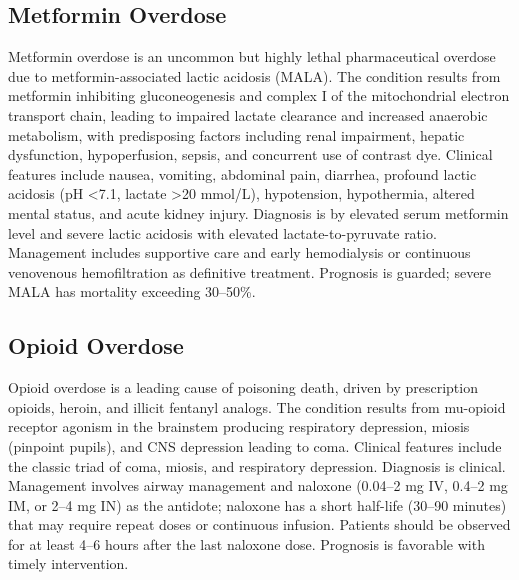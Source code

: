 \subsection{Metformin Overdose}
\label{sec:Metformin Overdose}
Metformin overdose is an uncommon but highly lethal pharmaceutical overdose due to metformin-associated lactic acidosis (MALA). The condition results from metformin inhibiting gluconeogenesis and complex I of the mitochondrial electron transport chain, leading to impaired lactate clearance and increased anaerobic metabolism, with predisposing factors including renal impairment, hepatic dysfunction, hypoperfusion, sepsis, and concurrent use of contrast dye. Clinical features include nausea, vomiting, abdominal pain, diarrhea, profound lactic acidosis (pH <7.1, lactate >20 mmol/L), hypotension, hypothermia, altered mental status, and acute kidney injury. Diagnosis is by elevated serum metformin level and severe lactic acidosis with elevated lactate-to-pyruvate ratio. Management includes supportive care and early hemodialysis or continuous venovenous hemofiltration as definitive treatment. Prognosis is guarded; severe MALA has mortality exceeding 30--50\%.

\subsection{Opioid Overdose}
\label{sec:Opioid Overdose}
Opioid overdose is a leading cause of poisoning death, driven by prescription opioids, heroin, and illicit fentanyl analogs. The condition results from mu-opioid receptor agonism in the brainstem producing respiratory depression, miosis (pinpoint pupils), and CNS depression leading to coma. Clinical features include the classic triad of coma, miosis, and respiratory depression. Diagnosis is clinical. Management involves airway management and naloxone (0.04--2 mg IV, 0.4--2 mg IM, or 2--4 mg IN) as the antidote; naloxone has a short half-life (30--90 minutes) that may require repeat doses or continuous infusion. Patients should be observed for at least 4--6 hours after the last naloxone dose. Prognosis is favorable with timely intervention.

